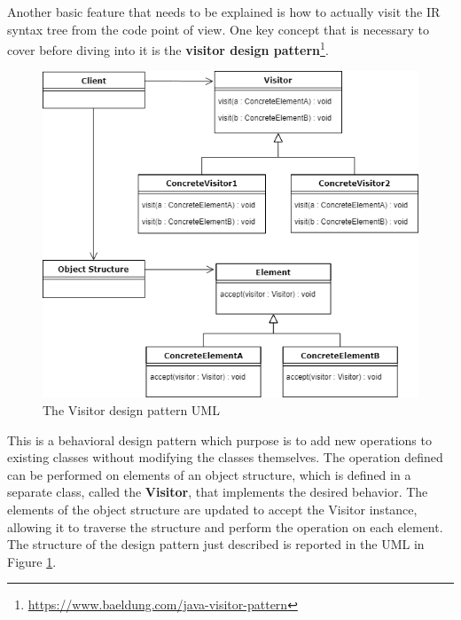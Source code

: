 Another basic feature that needs to be explained is how to actually visit the IR syntax tree from the code point of view. One key concept that is necessary to cover before diving into it is the \textbf{visitor design pattern}\footnote{\url{https://www.baeldung.com/java-visitor-pattern}\label{visitor_pattern_footnote}}.
\begin{figure}[!ht]
    \centering
    \includegraphics[scale=0.6]{document/chapters/2-metaprogramming/images/visitor_pattern_uml.png}
    \caption{The Visitor design pattern UML}
    \label{fig:visitor_uml}
\end{figure}
This is a behavioral design pattern which purpose is to add new operations to existing classes without modifying the classes themselves.\newline
The operation defined can be performed on elements of an object structure, which is defined in a separate class, called the \textbf{Visitor}, that implements the desired behavior. The elements of the object structure are updated to accept the Visitor instance, allowing it to traverse the structure and perform the operation on each element. The structure of the design pattern just described is reported in the UML in Figure \ref{fig:visitor_uml}.

